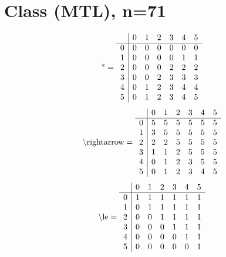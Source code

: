 \documentclass[11pt]{article}
\begin{document}
\section{Class (MTL), n=71}
\[\text{*} = 
\begin{array}{r | r r r r r r}
 & 0 & 1 & 2 & 3 & 4 & 5 \\ \hline
0 & 0 & 0 & 0 & 0 & 0 & 0 \\
1 & 0 & 0 & 0 & 0 & 1 & 1 \\
2 & 0 & 0 & 0 & 2 & 2 & 2 \\
3 & 0 & 0 & 2 & 3 & 3 & 3 \\
4 & 0 & 1 & 2 & 3 & 4 & 4 \\
5 & 0 & 1 & 2 & 3 & 4 & 5 \\
\end{array}
\]
\[\text{\textbackslash rightarrow} = 
\begin{array}{r | r r r r r r}
 & 0 & 1 & 2 & 3 & 4 & 5 \\ \hline
0 & 5 & 5 & 5 & 5 & 5 & 5 \\
1 & 3 & 5 & 5 & 5 & 5 & 5 \\
2 & 2 & 2 & 5 & 5 & 5 & 5 \\
3 & 1 & 1 & 2 & 5 & 5 & 5 \\
4 & 0 & 1 & 2 & 3 & 5 & 5 \\
5 & 0 & 1 & 2 & 3 & 4 & 5 \\
\end{array}
\]
\[\text{\textbackslash le} = 
\begin{array}{r | r r r r r r}
 & 0 & 1 & 2 & 3 & 4 & 5 \\ \hline
0 & 1 & 1 & 1 & 1 & 1 & 1 \\
1 & 0 & 1 & 1 & 1 & 1 & 1 \\
2 & 0 & 0 & 1 & 1 & 1 & 1 \\
3 & 0 & 0 & 0 & 1 & 1 & 1 \\
4 & 0 & 0 & 0 & 0 & 1 & 1 \\
5 & 0 & 0 & 0 & 0 & 0 & 1 \\
\end{array}
\]
\end{document}
